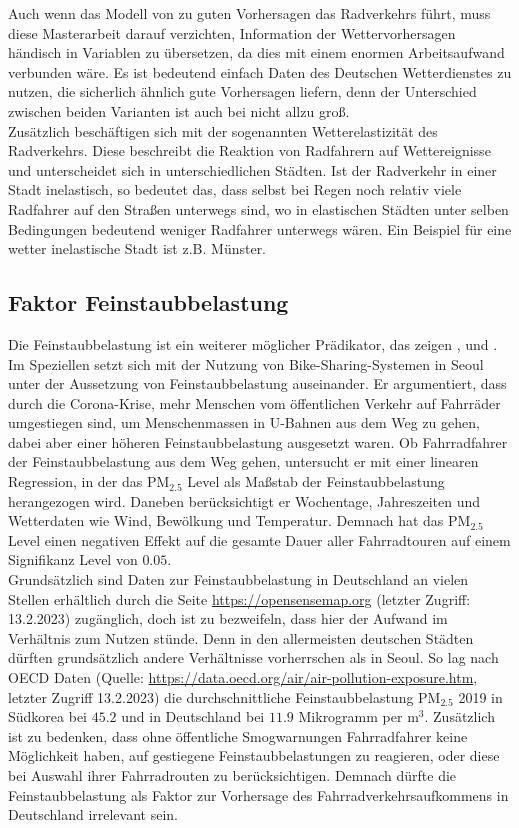\documentclass[a4paper,12pt]{thesis}
\begin{document}
Auch wenn das Modell von \cite{Wessel2020} zu guten Vorhersagen das Radverkehrs führt, muss diese Masterarbeit darauf verzichten, Information der Wettervorhersagen händisch in Variablen zu übersetzen, da dies mit einem enormen Arbeitsaufwand verbunden wäre. Es ist bedeutend einfach Daten des Deutschen Wetterdienstes zu nutzen, die sicherlich ähnlich gute Vorhersagen liefern, denn der Unterschied zwischen beiden Varianten ist auch bei \cite{Wessel2020} nicht allzu groß.\\
Zusätzlich beschäftigen sich \cite{Goldmann2021} mit der sogenannten Wetterelastizität des Radverkehrs. Diese beschreibt die Reaktion von Radfahrern auf Wettereignisse und unterscheidet sich in unterschiedlichen Städten. Ist der Radverkehr in einer Stadt inelastisch, so bedeutet das, dass selbst bei Regen noch relativ viele Radfahrer auf den Straßen unterwegs sind, wo in elastischen Städten unter selben Bedingungen bedeutend weniger Radfahrer unterwegs wären. Ein Beispiel für eine wetter inelastische Stadt ist z.B. Münster.


\subsection{Faktor Feinstaubbelastung}

Die Feinstaubbelastung ist ein weiterer möglicher Prädikator, das zeigen \cite{ZHAO2018826}, \cite{Gao2022} und \cite{Hong2022}. Im Speziellen setzt sich \cite{Hong2022} mit der Nutzung von Bike-Sharing-Systemen in Seoul unter der Aussetzung von Feinstaubbelastung auseinander. Er argumentiert, dass durch die Corona-Krise, mehr Menschen vom öffentlichen Verkehr auf Fahrräder umgestiegen sind, um Menschenmassen in U-Bahnen aus dem Weg zu gehen, dabei aber einer höheren Feinstaubbelastung ausgesetzt waren. Ob Fahrradfahrer der Feinstaubbelastung aus dem Weg gehen, untersucht er mit einer linearen Regression, in der das PM$_{2.5}$ Level als Maßstab der Feinstaubbelastung herangezogen wird. Daneben berücksichtigt er Wochentage, Jahreszeiten und Wetterdaten wie Wind, Bewölkung und Temperatur. Demnach hat das PM$_{2.5}$ Level einen negativen Effekt auf die gesamte Dauer aller Fahrradtouren auf einem Signifikanz Level von $0.05$.\\
Grundsätzlich sind Daten zur Feinstaubbelastung in Deutschland an vielen Stellen erhältlich durch die Seite \url{https://opensensemap.org} (letzter Zugriff: 13.2.2023) zugänglich, doch ist zu bezweifeln, dass hier der Aufwand im Verhältnis zum Nutzen stünde. Denn in den allermeisten deutschen Städten dürften grundsätzlich andere Verhältnisse vorherrschen als in Seoul. So lag nach OECD Daten (Quelle: \url{https://data.oecd.org/air/air-pollution-exposure.htm}, letzter Zugriff 13.2.2023) die durchschnittliche Feinstaubbelastung PM$_{2.5}$ 2019 in Südkorea bei $45.2$ und in Deutschland bei $11.9$ Mikrogramm per m$^3$. Zusätzlich ist zu bedenken, dass ohne öffentliche Smogwarnungen Fahrradfahrer keine Möglichkeit haben, auf gestiegene Feinstaubbelastungen zu reagieren, oder diese bei Auswahl ihrer Fahrradrouten zu berücksichtigen. Demnach dürfte die Feinstaubbelastung als Faktor zur Vorhersage des Fahrradverkehrsaufkommens in Deutschland irrelevant sein.
\end{document}
